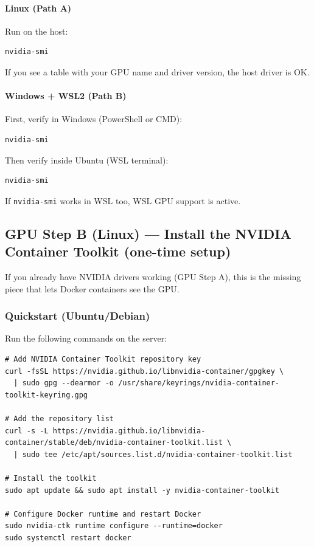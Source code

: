 \paragraph{Linux (Path A)}
Run on the host:
\begin{lstlisting}
nvidia-smi
\end{lstlisting}
If you see a table with your GPU name and driver version, the host driver is OK.

\paragraph{Windows + WSL2 (Path B)}
First, verify in Windows (PowerShell or CMD):
\begin{lstlisting}
nvidia-smi
\end{lstlisting}
Then verify inside Ubuntu (WSL terminal):
\begin{lstlisting}
nvidia-smi
\end{lstlisting}
If \texttt{nvidia-smi} works in WSL too, WSL GPU support is active.

\subsection{GPU Step B (Linux) --- Install the NVIDIA Container Toolkit (one-time setup)}
If you already have NVIDIA drivers working (GPU Step A), this is the missing piece that lets Docker containers see the GPU.


\subsubsection*{Quickstart (Ubuntu/Debian)}
Run the following commands on the server:

\begin{lstlisting}
# Add NVIDIA Container Toolkit repository key
curl -fsSL https://nvidia.github.io/libnvidia-container/gpgkey \
  | sudo gpg --dearmor -o /usr/share/keyrings/nvidia-container-toolkit-keyring.gpg

# Add the repository list
curl -s -L https://nvidia.github.io/libnvidia-container/stable/deb/nvidia-container-toolkit.list \
  | sudo tee /etc/apt/sources.list.d/nvidia-container-toolkit.list

# Install the toolkit
sudo apt update && sudo apt install -y nvidia-container-toolkit

# Configure Docker runtime and restart Docker
sudo nvidia-ctk runtime configure --runtime=docker
sudo systemctl restart docker
\end{lstlisting}

